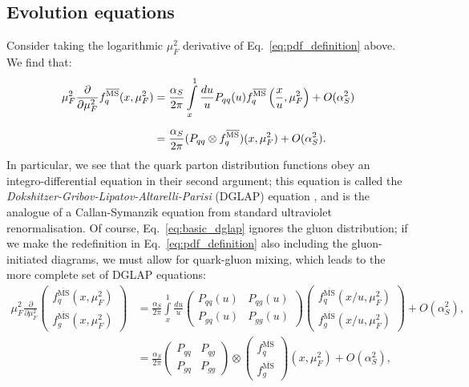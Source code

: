 \documentclass[withindex,glossary]{cam-thesis}
\begin{document}
\subsection{Evolution equations}
Consider taking the logarithmic $\mu_F^2$ derivative of Eq.~\eqref{eq:pdf_definition} above. We find that:
\begin{align}
\mu_F^2 \frac{\partial}{\partial \mu_F^2} f_q^{\overline{\text{MS}}}(x,\mu_F^2)& = \frac{\alpha_S}{2\pi} \int\limits_{x}^{1} \frac{du}{u} P_{qq}(u) f_q^{\overline{\text{MS}}}\left( \frac{x}{u}, \mu_F^2\right) + O(\alpha_S^2) \notag \\[1.5ex]
\label{eq:basic_dglap}
&= \frac{\alpha_S}{2\pi} (P_{qq} \otimes f_q^{\overline{\text{MS}}})(x, \mu_F^2) + O(\alpha_S^2).
\end{align}
In particular, we see that the quark parton distribution functions obey an integro-differential equation in their second argument; this equation is called the \textit{Dokshitzer-Gribov-Lipatov-Altarelli-Parisi} (DGLAP) equation \cite{Altarelli:1977zs,Dokshitzer:1977sg,Gribov:1972ri}, and is the analogue of a Callan-Symanzik equation from standard ultraviolet renormalisation. Of course, Eq.~\eqref{eq:basic_dglap} ignores the gluon distribution; if we make the redefinition in Eq.~\eqref{eq:pdf_definition} also including the gluon-initiated diagrams, we must allow for quark-gluon mixing, which leads to the more complete set of DGLAP equations:
\begin{align}
\mu_F^2 \frac{\partial}{\partial \mu_F^2} \begin{pmatrix} f_q^{\overline{\text{MS}}}(x,\mu_F^2) \\ f_g^{\overline{\text{MS}}}(x,\mu_F^2) \end{pmatrix} &= \frac{\alpha_S}{2\pi} \int\limits_{x}^{1} \frac{du}{u} \begin{pmatrix} P_{qq}(u) & P_{qg}(u) \\ P_{gq}(u) & P_{gg}(u) \end{pmatrix}  \begin{pmatrix} f_q^{\overline{\text{MS}}}\left( x/u, \mu_F^2\right) \\ f_g^{\overline{\text{MS}}}\left(x/u, \mu_F^2\right) \end{pmatrix} + O(\alpha_S^2),\\[1.5ex]
\label{eq:qcd_dglap}
&= \frac{\alpha_S}{2\pi} \begin{pmatrix} P_{qq} & P_{qg} \\ P_{gq} & P_{gg} \end{pmatrix}  \otimes \begin{pmatrix} f_q^{\overline{\text{MS}}} \\ f_g^{\overline{\text{MS}}} \end{pmatrix} \left(x , \mu_F^2\right) + O(\alpha_S^2),
\end{align}
\end{document}
